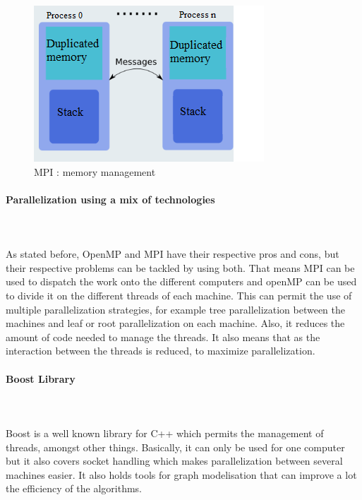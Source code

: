 \begin{figure}[!h] 
\centerline{\includegraphics[scale=0.85]{3_Software_considered/MultithreadingMP_boost_Visual_MPI_5000_Zotero_Project_Baptiste/MPI}}
   \caption{\label{étiquette} MPI : memory management}
\label{fig:MPI}
\end{figure}

\paragraph{Parallelization using a mix of technologies} \label{sec:hybrid}\mbox{}\\\mbox{}\\
As stated before, OpenMP and MPI have their respective pros and cons, but their respective problems can be tackled by using both. That means MPI can be used to dispatch the work onto the different computers and openMP can be used to divide it on the different threads of each machine. This can permit the use of multiple parallelization strategies, for example tree parallelization between the machines and leaf or root parallelization on each machine. Also, it reduces the amount of code needed to manage the threads. It also means that as the interaction between the threads is reduced, to maximize parallelization.

\paragraph{Boost Library}\mbox{}\\\mbox{}\\
Boost is a well known library for C++ which permits the management of threads, amongst other things. Basically, it can only be used for one computer but it also covers socket handling which makes parallelization between several machines easier. It also holds tools for graph modelisation that can improve a lot the efficiency of the algorithms.

